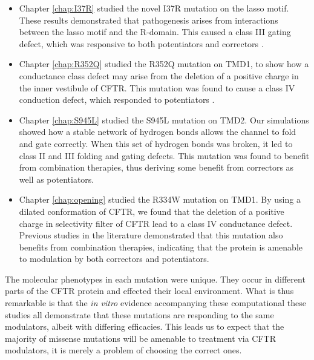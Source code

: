 
\begin{itemize}
	\item Chapter \ref{chap:I37R} studied the novel I37R mutation on the lasso motif. These results demonstrated that pathogenesis arises from interactions between the lasso motif and the R-domain. This caused a class III gating defect, which was responsive to both potentiators and correctors \cite{wong2022}. 
	\item Chapter \ref{chap:R352Q} studied the R352Q mutation on TMD1, to show how a conductance class defect may arise from the deletion of a positive charge in the inner vestibule of CFTR. This mutation was found to cause a class IV conduction defect, which responded to potentiators \cite{wong2022a}.
\item Chapter \ref{chap:S945L} studied the S945L mutation on TMD2. Our simulations showed how a stable network of hydrogen bonds allows the channel to fold and gate correctly. When this set of hydrogen bonds was broken, it led to class II and III folding and gating defects. This mutation was found to benefit from combination therapies, thus deriving some benefit from correctors as well as potentiators.  
\item Chapter \ref{chap:opening} studied the R334W mutation on TMD1. By using a dilated conformation of CFTR, we found that the deletion of a positive charge in selectivity filter of CFTR lead to a class IV conductance defect. Previous studies in the literature demonstrated that this mutation also benefits from combination therapies, indicating that the protein is amenable to modulation by both correctors and potentiators. 
\end{itemize}

The molecular phenotypes in each mutation were unique. They occur in different parts of the CFTR protein and effected their local environment. What is thus remarkable is that the \textit{in vitro} evidence accompanying these computational these studies all demonstrate that these mutations are responding to the same modulators, albeit with differing efficacies. This leads us to expect that the majority of missense mutations will be amenable to treatment via CFTR modulators, it is merely a problem of choosing the correct ones.

